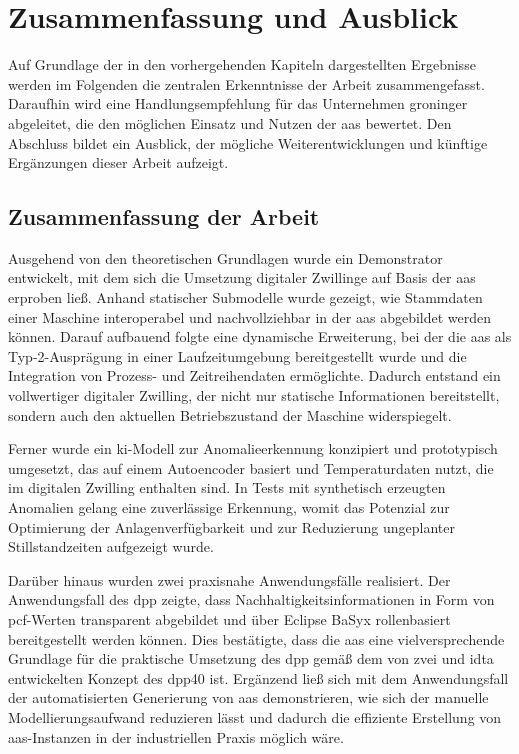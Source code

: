 \newpage
\section{Zusammenfassung und Ausblick}
\label{sec:Zusammenfassung}

Auf Grundlage der in den vorhergehenden Kapiteln dargestellten Ergebnisse werden im Folgenden die zentralen Erkenntnisse der Arbeit zusammengefasst. 
Daraufhin wird eine Handlungsempfehlung für das Unternehmen groninger abgeleitet, die den möglichen Einsatz und Nutzen der \acs{aas} bewertet. 
Den Abschluss bildet ein Ausblick, der mögliche Weiterentwicklungen und künftige Ergänzungen dieser Arbeit aufzeigt.

\subsection{Zusammenfassung der Arbeit}

Ausgehend von den theoretischen Grundlagen wurde ein Demonstrator entwickelt, mit dem sich die Umsetzung digitaler Zwillinge auf Basis der \acs{aas} erproben ließ.
Anhand statischer Submodelle wurde gezeigt, wie Stammdaten einer Maschine interoperabel und nachvollziehbar in der \acs{aas} abgebildet werden können.
Darauf aufbauend folgte eine dynamische Erweiterung, bei der die \acs{aas} als Typ-2-Ausprägung in einer Laufzeitumgebung bereitgestellt wurde und die Integration von Prozess- und Zeitreihendaten ermöglichte.
Dadurch entstand ein vollwertiger digitaler Zwilling, der nicht nur statische Informationen bereitstellt, sondern auch den aktuellen Betriebszustand der Maschine widerspiegelt.

Ferner wurde ein \acs{ki}-Modell zur Anomalieerkennung konzipiert und prototypisch umgesetzt, das auf einem Autoencoder basiert und Temperaturdaten nutzt, die im digitalen Zwilling enthalten sind.
In Tests mit synthetisch erzeugten Anomalien gelang eine zuverlässige Erkennung, womit das Potenzial zur Optimierung der Anlagenverfügbarkeit und zur Reduzierung ungeplanter Stillstandzeiten aufgezeigt wurde.

Darüber hinaus wurden zwei praxisnahe Anwendungsfälle realisiert.
Der Anwendungsfall des \acs{dpp} zeigte, dass Nachhaltigkeitsinformationen in Form von \acs{pcf}-Werten transparent abgebildet und über Eclipse BaSyx rollenbasiert bereitgestellt werden können.
Dies bestätigte, dass die \acs{aas} eine vielversprechende Grundlage für die praktische Umsetzung des \acs{dpp} gemäß dem von \acs{zvei} und \acs{idta} entwickelten Konzept des \acs{dpp40} ist.
Ergänzend ließ sich mit dem Anwendungsfall der automatisierten Generierung von \acs{aas} demonstrieren, wie sich der manuelle Modellierungsaufwand reduzieren lässt und dadurch die effiziente Erstellung von \acs{aas}-Instanzen in der industriellen Praxis möglich wäre.

